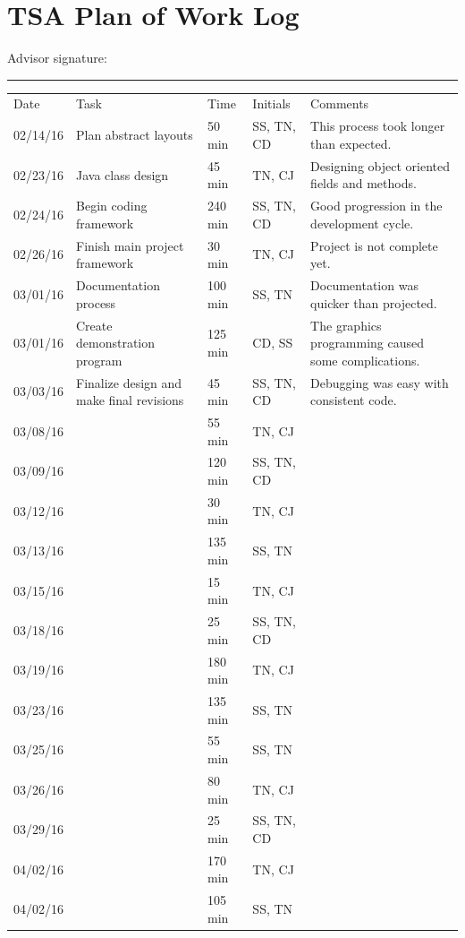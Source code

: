 \documentclass[letterpaper, 10pt]{article}
\begin{document}
\section{TSA Plan of Work Log}
	
	Advisor signature:
	\rule{10cm}{0.4pt}
	\footnotesize
	\begin{center}
	\renewcommand{\arraystretch}{2.15}
	\begin{tabular} { l || p{1.25 in}| l| l|p{2.50in}}
		Date 	& Task 								& Time 	& Initials 		& Comments \\
		02/14/16 	& Plan abstract layouts 					& 50 min 	& SS, TN, CD	& This process took longer than expected. \\
		02/23/16 	& Java class design 						& 45 min 	& TN, CJ 		& Designing object oriented fields and methods.\\
		02/24/16 	& Begin coding framework 				& 240 min & SS, TN, CD	& Good progression in the development cycle.\\
		02/26/16 	& Finish main project framework 			& 30 min	& TN, CJ		& Project is not complete yet.\\
		03/01/16 	& Documentation process 				& 100 min	& SS, TN 		& Documentation was quicker than projected.\\
		03/01/16 	& Create demonstration program 			& 125 min	& CD, SS 		& The graphics programming caused some complications.\\
		03/03/16 	& Finalize design and make final revisions 	& 45 min 	& SS, TN, CD 	& Debugging was easy with consistent code.\\
		03/08/16 	& 									& 55 min 	& TN, CJ 		& \\
		03/09/16 	& 					 				& 120 min & SS, TN, CD	& \\
		03/12/16 	&  									& 30 min	& TN, CJ		& \\
		03/13/16 	&  									& 135 min	& SS, TN 		& \\
		03/15/16 	&  									& 15 min 	& TN, CJ 		& \\
		03/18/16 	&  									& 25 min 	& SS, TN, CD	& \\
		03/19/16 	&  									& 180 min	& TN, CJ		& \\
		03/23/16 	&  									& 135 min	& SS, TN 		& \\
		03/25/16 	&  									& 55 min	& SS, TN 		& \\
		03/26/16 	&  									& 80 min 	& TN, CJ 		& \\
		03/29/16 	&  									& 25 min 	& SS, TN, CD	& \\
		04/02/16 	&  									& 170 min	& TN, CJ		& \\
		04/02/16 	& 					 				& 105 min	& SS, TN 		& \\
		
	\end{tabular}
	\end{center}
	
\end{document}
